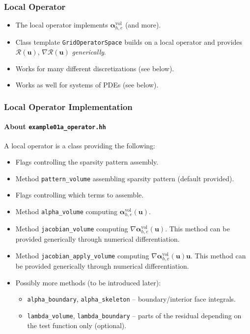\begin{frame}
\frametitle{Local Operator}
\begin{itemize}
\item The local operator implements $\bm{\alpha}_{h,e}^{\text{vol}}$ (and more).
\item Class template \lstinline{GridOperatorSpace} builds on a local operator and
provides $\mathcal{R}(\mathbf{u})$, $\nabla\mathcal{R}(\mathbf{u})$ \textit{generically}.
\item Works for many different discretizations (see below).
\item Works as well for systems of PDEs (see below).
\end{itemize}
\end{frame}

\begin{frame}
\frametitle{Local Operator Implementation}
\framesubtitle{About \lstinline{example01a_operator.hh}}
A local operator is a class providing the following:
\begin{itemize}
\item Flags controlling the sparsity pattern assembly.
\item Method \lstinline{pattern_volume} assembling sparsity pattern (default provided).
\item Flags controlling which terms to assemble.
\item Method \lstinline{alpha_volume} computing $\bm{\alpha}_{h,e}^{\text{vol}}(\mathbf{u})$.
\item Method \lstinline{jacobian_volume} computing $\nabla\bm{\alpha}_{h,e}^{\text{vol}}(\mathbf{u})$. 
This method can be provided generically through numerical differentiation.
\item Method \lstinline{jacobian_apply_volume} computing $\nabla\bm{\alpha}_{h,e}^{\text{vol}}(\mathbf{u})\mathbf{u}$. 
This method can be provided generically through numerical differentiation.
\item Possibly more methods (to be introduced later):
\begin{itemize}
\item \lstinline{alpha_boundary}, \lstinline{alpha_skeleton} -- boundary/interior face integrals.
\item \lstinline{lambda_volume}, \lstinline{lambda_boundary} -- parts of the residual depending on the test function only (optional).
\end{itemize}
\end{itemize}
\end{frame}

